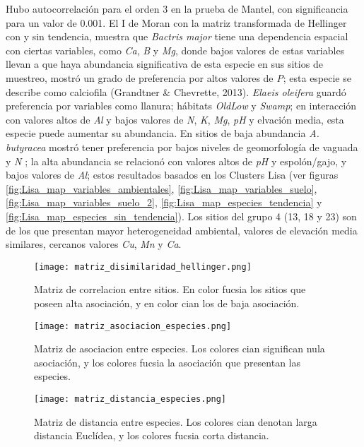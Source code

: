 \documentclass[11pt,]{article}
\begin{document}
Hubo autocorrelación para el orden 3 en la prueba de Mantel, con
significancia para un valor de 0.001. El I de Moran con la matriz
transformada de Hellinger con y sin tendencia, muestra que \emph{Bactris
major} tiene una dependencia espacial con ciertas variables, como
\emph{Ca}, \emph{B} y \emph{Mg}, donde bajos valores de estas variables
llevan a que haya abundancia significativa de esta especie en sus sitios
de muestreo, mostró un grado de preferencia por altos valores de
\emph{P}; esta especie se describe como calciofila (Grandtner \&
Chevrette, 2013). \emph{Elaeis oleifera} guardó preferencia por
variables como llanura; hábitats \emph{OldLow} y \emph{Swamp}; en
interacción con valores altos de \emph{Al} y bajos valores de \emph{N},
\emph{K}, \emph{Mg}, \emph{pH} y elvación media, esta especie puede
aumentar su abundancia. En sitios de baja abundancia \emph{A. butyracea}
mostró tener preferencia por bajos niveles de geomorfología de vaguada y
\emph{N} ; la alta abundancia se relacionó con valores altos de
\emph{pH} y espolón/gajo, y bajos valores de \emph{Al}; estos resultados
basados en los Clusters Lisa (ver figuras
\ref{fig:Lisa_map_variables_ambientales},
\ref{fig:Lisa_map_variables_suelo},
\ref{fig:Lisa_map_variables_suelo_2},
\ref{fig:Lisa_map_especies_tendencia} y
\ref{fig:Lisa_map_especies_sin_tendencia}). Los sitios del grupo 4 (13,
18 y 23) son de los que presentan mayor heterogeneidad ambiental,
valores de elevación media similares, cercanos valores \emph{Cu},
\emph{Mn} y \emph{Ca}.

\begin{figure}
\centering
\texttt{[image: matriz\_disimilaridad\_hellinger.png]}
\caption{Matriz de correlacion entre sitios. En color fucsia los sitios
que poseen alta asociación, y en color cian los de baja asociación.
\label{fig:matriz_disimilaridad_hellinger}}
\end{figure}

\begin{figure}
\centering
\texttt{[image: matriz\_asociacion\_especies.png]}
\caption{Matriz de asociacion entre especies. Los colores cian
significan nula asociación, y los colores fucsia la asociación que
presentan las especies. \label{fig:matriz_asociacion_especies}}
\end{figure}

\begin{figure}
\centering
\texttt{[image: matriz\_distancia\_especies.png]}
\caption{Matriz de distancia entre especies. Los colores cian denotan
larga distancia Euclídea, y los colores fucsia corta distancia.
\label{fig:matriz_distancia_especies}}
\end{figure}
\end{document}

